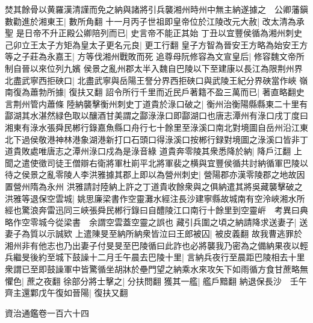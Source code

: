 焚其餘骨以黄羅漢清謹而免之納與諸將引兵襲湘州時州中無主納遂據之　公卿藩鎭數勸進於湘東王|{
	數所角翻}
十一月丙子世祖即皇帝位於江陵改元大赦|{
	改太清為承聖}
是日帝不升正殿公卿陪列而已|{
	史言帝不能正其始}
丁丑以宜豐侯循為湘州刺史己卯立王太子方矩為皇太子更名元良|{
	更工行翻}
皇子方智為晉安王方略為始安王方等之子莊為永嘉王|{
	方等伐湘州戰敗而死}
追尊母阮修容為文宣皇后|{
	修容魏文帝所制自晉以來位列九嬪}
侯景之亂州郡太半入魏自巴陵以下至建康以長江為限荆州界北盡武寧西拒硤口|{
	北盡武寧與岳陽王詧分界西拒硤口與武陵王紀分界硤當作峽}
嶺南復為蕭勃所據|{
	復扶又翻}
詔令所行千里而近民戶著籍不盈三萬而已|{
	著直略翻史言荆州管内蕭條}
陸納襲擊衡州刺史丁道貴於淥口破之|{
	衡州治衡陽縣縣東二十里有酃湖其水湛然緑色取以釀酒甘美謂之酃淥淥口即酃湖口也唐志潭州有淥口戌丁度曰湘東有淥水張舜民郴行錄嘉魚縣口舟行七十餘里至淥溪口南北對境圖自岳州沿江東北下過侯敬港神林港象湖港新打口石頭口得淥溪口按郴行録對境圖之淥溪口皆非丁道貴敗處唯唐志之潭州淥口戍為是淥音綠}
道貴奔零陵其衆悉降於納|{
	降戶江翻}
上聞之遣使徵司徒王僧辯右衛將軍杜崱平北將軍裴之横與宜豐侯循共討納循軍巴陵以待之侯景之亂零陵人李洪雅據其郡上即以為營州刺史|{
	營陽郡亦漢零陵郡之地故因置營州隋為永州}
洪雅請討陸納上許之丁道貴收餘衆與之俱納遣其將吳藏襲擊破之洪雅等退保空雲城|{
	姚思廉梁書作空靈灘水經注長沙建寧縣故城南有空泠峽湘水所經也驚浪奔雷迅同三峽張舜民郴行錄曰自醴陵江口南行十餘里到空靈㟁　考異曰典略作空零城今從梁書　余謂空雲蓋空靈之誤也}
藏引兵圍之頃之納請降求送妻子|{
	送妻子為質以示誠欵}
上遣陳旻至納所納衆皆泣曰王郎被囚|{
	被皮義翻}
故我曹逃罪於湘州非有他志也乃出妻子付旻旻至巴陵循曰此詐也必將襲我乃密為之備納果夜以輕兵繼旻後約至城下鼓譟十二月壬午晨去巴陵十里|{
	言納兵夜行至晨距巴陵相去十里}
衆謂已至即鼓譟軍中皆驚循坐胡牀於壘門望之納乘水來攻矢下如雨循方食甘蔗略無懼色|{
	蔗之夜翻}
徐部分將士擊之|{
	分扶問翻}
獲其一艦|{
	艦戶黯翻}
納退保長沙　壬午齊主還鄴戊午復如晉陽|{
	復扶又翻}


資治通鑑卷一百六十四
